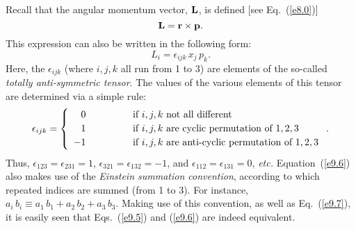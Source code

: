 Recall that the angular momentum vector, ${\bf L}$, is defined [see Eq.~(\ref{e8.0})]
\begin{equation}\label{e9.5}
{\bf L} = {\bf r}\times {\bf p}.
\end{equation}
This expression can also be written in the following form:
\begin{equation}\label{e9.6}
L_i = \epsilon_{ijk}\,x_j\,p_k.
\end{equation}
Here, the $\epsilon_{ijk}$ (where $i,j,k$ all run from 1 to 3) are 
elements of the so-called {\em totally anti-symmetric tensor}. The values of
the various
elements of this tensor are determined via a simple rule:
\begin{equation}\label{e9.7}
\epsilon_{ijk} = \left\{
\begin{array}{rcl}
0 &\mbox{\hspace{1cm}}&\mbox{if $i,j,k$ not all different}\\[0.5ex]
1 &&\mbox{if $i,j,k$ are cyclic permutation of $1,2,3$}\\[0.5ex]
-1 &&\mbox{if $i,j,k$ are anti-cyclic permutation of $1,2,3$}
\end{array}\right. .
\end{equation}
Thus, $\epsilon_{123}=\epsilon_{231}=1$, $\epsilon_{321}=\epsilon_{132}=-1$, and $\epsilon_{112}=\epsilon_{131}=0$, {\em etc.}
Equation~(\ref{e9.6}) also makes use of the {\em Einstein summation
convention}, according to which repeated indices are summed (from
1 to 3). For instance, $a_i\,b_i\equiv a_1\,b_1+a_2\,b_2+a_3\,b_3$. 
Making use of this convention, as well as Eq.~(\ref{e9.7}), it
is easily seen that Eqs.~(\ref{e9.5}) and (\ref{e9.6}) are indeed equivalent.

